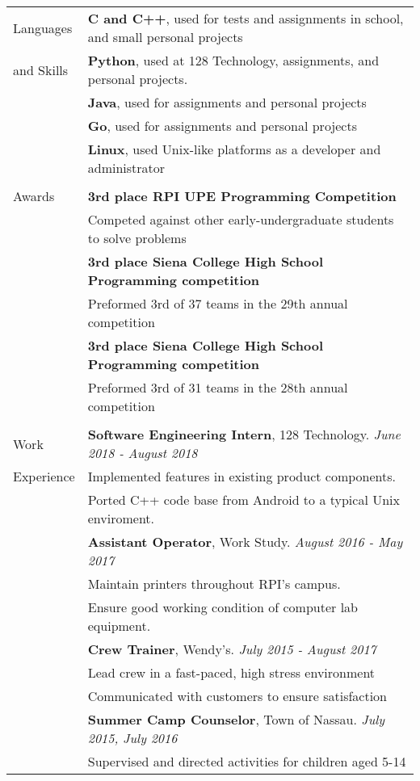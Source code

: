 \documentclass[letterpaper,10pt,oneside]{article}
\begin{document}
\begin{tabular}{@{} l l}
  \Large{Languages}
  & \textbf{C and C++}, used for tests and assignments in school, and small personal projects \\
  \Large{and Skills}
  & \textbf{Python}, used at 128 Technology, assignments, and personal projects. \\
  & \textbf{Java}, used for assignments and personal projects \\
  & \textbf{Go}, used for assignments and personal projects \\
  & \textbf{Linux}, used Unix-like platforms as a developer and administrator \\
  & \\

  \Large{Awards}
  & \textbf{3rd place RPI UPE Programming Competition} \\
  & Competed against other early-undergraduate students to solve problems \\
  & \textbf{3rd place Siena College High School Programming competition} \\
  & Preformed 3rd of 37 teams in the 29th annual competition \\
  & \textbf{3rd place Siena College High School Programming competition} \\
  & Preformed 3rd of 31 teams in the 28th annual competition \\
  & \\

  \Large{Work}
  & \textbf{Software Engineering Intern}, 128 Technology. \textit{June 2018 - August 2018} \\
  \Large{Experience}
  & Implemented features in existing product components. \\
  & Ported C++ code base from Android to a typical Unix enviroment. \\
  & \textbf{Assistant Operator}, Work Study. \textit{August 2016 - May 2017} \\
  & Maintain printers throughout RPI's campus. \\
  & Ensure good working condition of computer lab equipment. \\
  & \textbf{Crew Trainer}, Wendy's. \textit{July 2015 - August 2017} \\
  & Lead crew in a fast-paced, high stress environment \\
  & Communicated with customers to ensure satisfaction \\
  & \textbf{Summer Camp Counselor}, Town of Nassau. \textit{July 2015, July 2016} \\
  & Supervised and directed activities for children aged 5-14 \\

\end{tabular}
\end{document}
